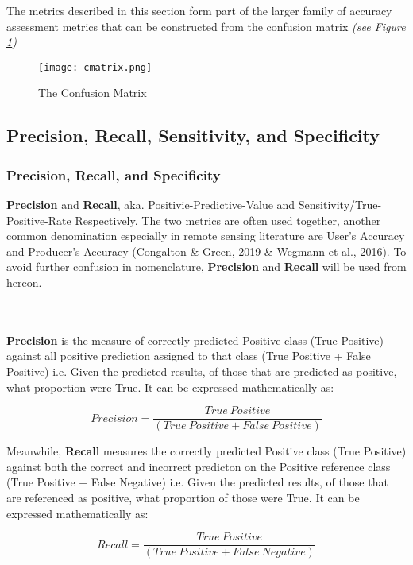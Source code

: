 \documentclass[11pt, a4paper, twoside]{report}
\begin{document}
The metrics described in this section form part of the larger family of accuracy assessment metrics that can be constructed from the confusion matrix \textit{(see Figure \ref{fig:cmatrix})}

\begin{figure}[h]
  \centering
  \texttt{[image: cmatrix.png]}
  \caption{The Confusion Matrix}
  \label{fig:cmatrix}
\end{figure}

\subsection{Precision, Recall, Sensitivity, and Specificity}\label{1storder}
\subsubsection{Precision, Recall, and Specificity}\label{PR&S}

\textbf{Precision} and \textbf{Recall}, aka. Positivie-Predictive-Value and Sensitivity/True-Positive-Rate Respectively. The two metrics are often used together, another common denomination especially in remote sensing literature are User's Accuracy and Producer's Accuracy (Congalton \& Green, 2019 \& Wegmann et al., 2016). To avoid further confusion in nomenclature, \textbf{Precision} and \textbf{Recall} will be used from hereon.\\\par
\\
\\
\textbf{Precision} is the measure of correctly predicted Positive class (True Positive) against all positive prediction assigned to that class (True Positive + False Positive) i.e. Given the predicted results, of those that are predicted as positive, what proportion were True. It can be expressed mathematically as:

\begin{equation}
  Precision = \frac{True\ Positive} {(True\ Positive + False\ Positive)}
\end{equation}

Meanwhile, \textbf{Recall} measures the correctly predicted Positive class (True Positive) against both the correct and incorrect predicton on the Positive reference class (True Positive + False Negative) i.e. Given the predicted results, of those that are referenced as positive, what proportion of those were True. It can be expressed mathematically as:

\begin{equation}
  Recall = \frac{True\ Positive} {(True\ Positive + False\ Negative)}
\end{equation}
\end{document}
